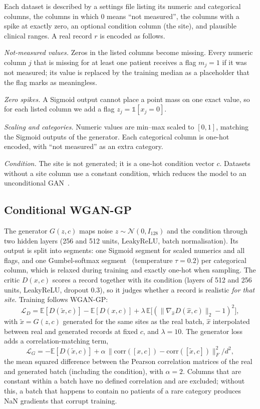 \documentclass[runningheads]{llncs}
\begin{document}
Each dataset is described by a settings file listing its numeric and
categorical columns, the columns in which 0 means ``not measured'', the
columns with a spike at exactly zero, an optional condition column (the
site), and plausible clinical ranges. A real record $r$ is encoded as
follows.

\emph{Not-measured values.} Zeros in the listed columns become missing.
Every numeric column $j$ that is missing for at least one patient receives
a flag $m_j = 1$ if it was not measured; its value is replaced by the
training median as a placeholder that the flag marks as meaningless.

\emph{Zero spikes.} A Sigmoid output cannot place a point mass on one exact
value, so for each listed column we add a flag $z_j = \mathbb{1}[x_j = 0]$.

\emph{Scaling and categories.} Numeric values are min--max scaled to
$[0,1]$, matching the Sigmoid outputs of the generator. Each categorical
column is one-hot encoded, with ``not measured'' as an extra category.

\emph{Condition.} The site is not generated; it is a one-hot condition
vector $c$. Datasets without a site column use a constant condition, which
reduces the model to an unconditional GAN~\cite{goodfellow2014gan}.

\subsection{Conditional WGAN-GP}

The generator $G(z, c)$ maps noise $z \sim \mathcal{N}(0, I_{128})$ and the
condition through two hidden layers (256 and 512 units, LeakyReLU, batch
normalisation). Its output is split into segments: one Sigmoid segment for
scaled numerics and all flags, and one Gumbel-softmax
segment~\cite{jang2017gumbel} (temperature $\tau = 0.2$) per categorical
column, which is relaxed during training and exactly one-hot when sampling.
The critic $D(x, c)$ scores a record together with its condition (layers of
512 and 256 units, LeakyReLU, dropout 0.3), so it judges whether a record is
realistic \emph{for that site}. Training follows WGAN-GP:
\begin{equation}
\mathcal{L}_D = \mathbb{E}[D(\tilde{x}, c)] - \mathbb{E}[D(x, c)]
  + \lambda\, \mathbb{E}\big[(\lVert \nabla_{\hat{x}} D(\hat{x}, c) \rVert_2 - 1)^2\big],
\end{equation}
with $\tilde{x} = G(z, c)$ generated for the same sites as the real batch,
$\hat{x}$ interpolated between real and generated records at fixed $c$, and
$\lambda = 10$. The generator loss adds a correlation-matching term,
\begin{equation}
\mathcal{L}_G = -\mathbb{E}[D(\tilde{x}, c)]
  + \alpha\, \big\lVert \mathrm{corr}([x, c]) - \mathrm{corr}([\tilde{x}, c]) \big\rVert_F^2 / d^2,
\end{equation}
the mean squared difference between the Pearson correlation matrices of the
real and generated batch (including the condition), with $\alpha = 2$.
Columns that are constant within a batch have no defined correlation and
are excluded; without this, a batch that happens to contain no patients of
a rare category produces NaN gradients that corrupt training.
\end{document}
